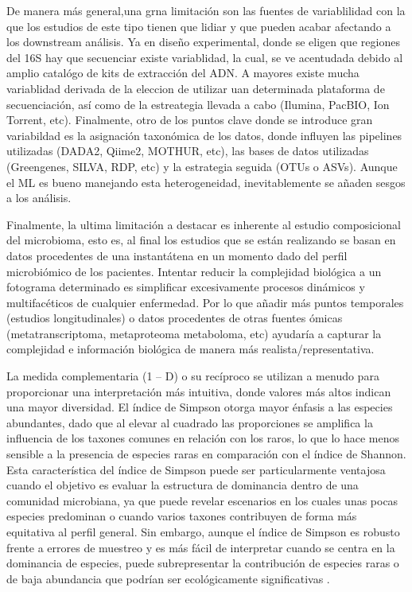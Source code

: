 De manera más general,una grna limitación son las fuentes de variablilidad con la que los estudios de este tipo tienen que lidiar y que pueden acabar afectando a los downstream análisis. Ya en diseño experimental, donde se eligen que regiones del 16S hay que secuenciar existe variablidad, la cual, se ve acentudada debido al amplio catalógo de kits de extracción del ADN. A mayores existe mucha variablidad derivada de la eleccion de utilizar uan determinada plataforma de secuenciación, así como de la estreategia llevada a cabo (Ilumina, PacBIO, Ion Torrent, etc). Finalmente, otro de los puntos clave donde se introduce gran variabildad es la asignación taxonómica de los datos, donde influyen las pipelines utilizadas (DADA2, Qiime2, MOTHUR, etc), las bases de datos utilizadas (Greengenes, SILVA, RDP, etc) y la estrategia seguida (OTUs o ASVs). Aunque el ML es bueno manejando esta heterogeneidad, inevitablemente se añaden sesgos a los análisis.

Finalmente, la ultima limitación a destacar es inherente al estudio composicional del microbioma, esto es, al final los estudios que se están realizando se basan en datos procedentes de una instantátena en un momento dado del perfil microbiómico de los pacientes. Intentar reducir la complejidad biológica a un fotograma determinado es simplificar excesivamente procesos dinámicos y multifacéticos de cualquier enfermedad.
Por lo que añadir más puntos temporales (estudios longitudinales) o datos procedentes de otras fuentes ómicas (metatranscriptoma, metaproteoma metaboloma, etc) ayudaría a capturar la complejidad e información biológica de manera más realista/representativa.




La medida complementaria (1 – D) o su recíproco se utilizan a menudo para proporcionar una interpretación más intuitiva, donde valores más altos indican una mayor diversidad. El índice de Simpson otorga mayor énfasis a las especies abundantes, dado que al elevar al cuadrado las proporciones se amplifica la influencia de los taxones comunes en relación con los raros, lo que lo hace menos sensible a la presencia de especies raras en comparación con el índice de Shannon. Esta característica del índice de Simpson puede ser particularmente ventajosa cuando el objetivo es evaluar la estructura de dominancia dentro de una comunidad microbiana, ya que puede revelar escenarios en los cuales unas pocas especies predominan o cuando varios taxones contribuyen de forma más equitativa al perfil general. Sin embargo, aunque el índice de Simpson es robusto frente a errores de muestreo y es más fácil de interpretar cuando se centra en la dominancia de especies, puede subrepresentar la contribución de especies raras o de baja abundancia que podrían ser ecológicamente significativas \cite{finotello2018measuring}.


